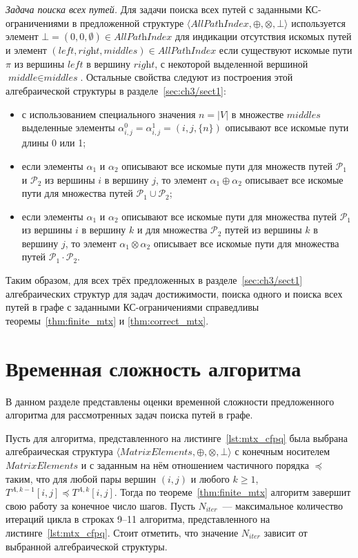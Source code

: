 \textit{Задача поиска всех путей.} Для задачи поиска всех путей с заданными КС-ограничениями в предложенной структуре $\langle \textit{AllPathIndex}, \oplus, \otimes, \bot \rangle$ используется элемент $\bot = (0, 0, \emptyset) \in \textit{AllPathIndex}$ для индикации отсутствия искомых путей и элемент $(\textit{left}, \textit{right}, \textit{middles}) \in \textit{AllPathIndex}$ если существуют искомые пути $\pi$ из вершины $\textit{left}$ в вершину $\textit{right}$, с некоторой выделенной вершиной $\textit{middle} \in \textit{middles}$. Остальные свойства следуют из построения этой алгебраической структуры в разделе~\ref{sec:ch3/sect1}:
\begin{itemize}
        \item с использованием специального значения $n = |V|$ в множестве $\textit{middles}$ выделенные элементы $\alpha^0_{i, j} = \alpha^1_{i, j} = (i, j, \{n\})$ описывают все искомые пути длины 0 или 1;
	    \item если элементы $\alpha_1$ и $\alpha_2$ описывают все искомые пути для множеств путей $\mathcal{P}_1$ и $\mathcal{P}_2$ из вершины $i$ в вершину $j$, то элемент $\alpha_1 \oplus \alpha_2$ описывает все искомые пути для множества путей $\mathcal{P}_1 \cup \mathcal{P}_2$;
	    \item если элементы $\alpha_1$ и $\alpha_2$ описывают все искомые пути для множества путей $\mathcal{P}_1$ из вершины $i$ в вершину $k$ и для множества $\mathcal{P}_2$ путей из вершины $k$ в вершину $j$, то элемент $\alpha_1 \otimes \alpha_2$ описывает все искомые пути для множества путей $\mathcal{P}_1 \cdot \mathcal{P}_2$.
	\end{itemize}
	
Таким образом, для всех трёх предложенных в разделе~\ref{sec:ch3/sect1} алгебраических структур для задач достижимости, поиска одного и поиска всех путей в графе с заданными КС-ограничениями справедливы теоремы~\ref{thm:finite_mtx} и \ref{thm:correct_mtx}.

\section{Временная сложность алгоритма}\label{sec:ch3/sect3}
В данном разделе представлены оценки временной сложности предложенного алгоритма для рассмотренных задач поиска путей в графе.

Пусть для алгоритма, представленного на листинге~\ref{lst:mtx_cfpq} была выбрана алгебраическая структура $\langle \textit{MatrixElements}, \oplus, \otimes, \bot \rangle$ с конечным носителем $\textit{MatrixElements}$ и с заданным на нём отношением частичного порядка $\preceq$ таким, что для любой пары вершин $(i, j)$ и любого $k \geq 1$, $T^{A, k - 1}[i, j] \preceq T^{A, k}[i, j]$. Тогда по теореме~\ref{thm:finite_mtx} алгоритм завершит свою работу за конечное число шагов. Пусть $N_{\textit{iter}}$~---  максимальное количество итераций цикла в строках 9--11 алгоритма, представленного на листинге~\ref{lst:mtx_cfpq}. Стоит отметить, что значение $N_{\textit{iter}}$ зависит от выбранной алгебраической структуры. 

